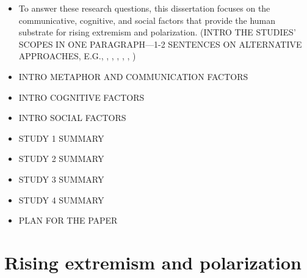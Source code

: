 \documentclass[12pt,letterpaper]{article}
\begin{document}
\begin{itemize}
  \item
    To answer these research questions, this dissertation focuses on the communicative, cognitive,
    and social factors that provide the human substrate for rising extremism
    and polarization. (INTRO THE STUDIES' SCOPES IN ONE PARAGRAPH---1-2 SENTENCES ON
    ALTERNATIVE APPROACHES, E.G., \cite{Zmigrod2018}, \cite{Mason2018}, \cite{Iyengar2019},
    \cite{Wood2017}, \cite{Dixit2007}, \cite{Jern2014,OConnor2018})

  \item
    INTRO METAPHOR AND COMMUNICATION FACTORS

  \item
    INTRO COGNITIVE FACTORS

  \item
    INTRO SOCIAL FACTORS

  \item
    STUDY 1 SUMMARY

  \item
    STUDY 2 SUMMARY

  \item
    STUDY 3 SUMMARY

  \item
    STUDY 4 SUMMARY

  \item
    PLAN FOR THE PAPER

\end{itemize}


\section{Rising extremism and polarization}
\end{document}
